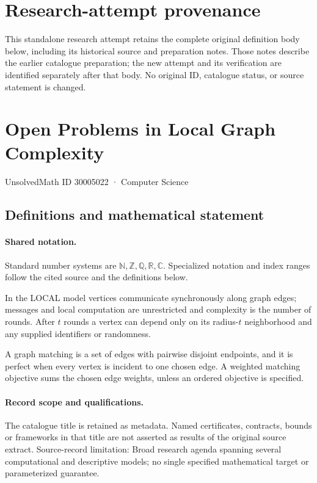 \documentclass[11pt]{article}
\begin{document}
\section*{Research-attempt provenance}
This standalone research attempt retains the complete original definition body below,
including its historical source and preparation notes. Those notes describe the
earlier catalogue preparation; the new attempt and its verification are identified
separately after that body. No original ID, catalogue status, or source statement is changed.

\section{Open Problems in Local Graph Complexity}\label{30005022}
{\small UnsolvedMath ID 30005022 · Computer Science}
\subsection{Definitions and mathematical statement}

\paragraph{Shared notation.}Standard number systems are $\mathbb N,\mathbb Z,\mathbb Q,\mathbb R,\mathbb C$. Specialized notation and index ranges follow the cited source and the definitions below.


In the LOCAL model vertices communicate synchronously along graph edges; messages and local computation are unrestricted and complexity is the number of rounds. After $t$ rounds a vertex can depend only on its radius-$t$ neighborhood and any supplied identifiers or randomness.

A graph matching is a set of edges with pairwise disjoint endpoints, and it is perfect when every vertex is incident to one chosen edge. A weighted matching objective sums the chosen edge weights, unless an ordered objective is specified.
\paragraph{Record scope and qualifications.}
The catalogue title is retained as metadata. Named certificates, contracts, bounds or frameworks in that title are not asserted as results of the original source extract.
Source-record limitation: Broad research agenda spanning several computational and descriptive models; no single specified mathematical target or parameterized guarantee.
\end{document}
